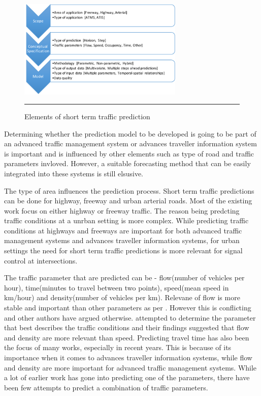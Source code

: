 \begin{figure}[htbp]
  \centering
    \includegraphics[width=0.7\textwidth,height=0.7\textheight,keepaspectratio]{Figures/sttp-process.pdf}
    \rule{35em}{0.5pt}
  \caption[Elements of short term traffic prediction]{Elements of short term traffic prediction}
  \label{fig:sttp-process}
\end{figure}

Determining whether the prediction model to be developed is going to be part of an advanced
traffic management system or advances traveller information system is important and is influenced
by other elements such as type of road and traffic parameters invloved. However, a suitable
forecasting method that can be easily integrated into these systems is still elsusive.

The type of area influences the prediction process. Short term traffic predictions can be done for
highway, freeway and urban arterial roads. Most of the existing work focus on either highway or
freeway traffic. The reason being predcting traffic conditions at a unrban setting is more complex.
While predicting traffic conditions at highways and freeways are important for both advanced traffic
management systems and advances traveller information systems, for urban settings the need for short
term traffic predictions is more relevant for signal control at intersections.

The traffic parameter that are predicted can be - flow(number of vehicles per hour), time(minutes
to travel between two points), speed(mean speed in km/hour) and density(number of vehicles per km).
Relevane of flow is more stable and important than other parameters as per \citet{levin1980forecasting}.
However this is conflicting and other authors have argued otherwise. \citet{dougherty1997short} attempted
to determine the parameter that best describes the traffic conditions and their findings suggested that
flow and density are more relevant than speed. Predicting travel time has also been the focus of many
works, especially in recent years. This is because of its importance when it comes to advances traveller
information systems, while flow and density are more important for advanced traffic management systems.
While a lot of earlier work has gone into predicting one of the parameters, there have been few
attempts to predict a combination of traffic parameters.


